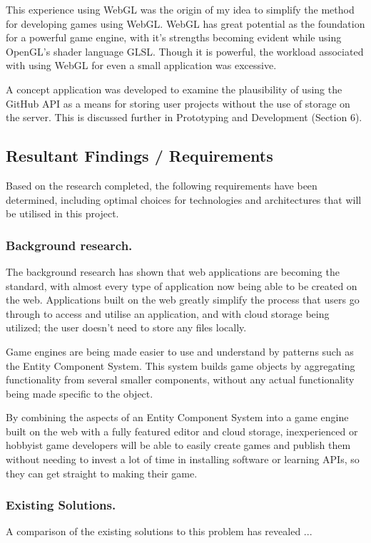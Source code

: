 \documentclass[a4paper, 12pt]{article}
\begin{document}
This experience using WebGL was the origin of my idea to simplify the method for developing games using WebGL. WebGL has great potential as the foundation for a powerful game engine, with it's strengths becoming evident while using OpenGL's shader language GLSL. Though it is powerful, the workload associated with using WebGL for even a small application was excessive.

A concept application was developed to examine the plausibility of using the GitHub API as a means for storing user projects without the use of storage on the server. This is discussed further in Prototyping and Development (Section 6).

\subsection{Resultant Findings / Requirements}
Based on the research completed, the following requirements have been determined, including optimal choices for technologies and architectures that will be utilised in this project.

\subsubsection{Background research.}
The background research has shown that web applications are becoming the standard, with almost every type of application now being able to be created on the web. Applications built on the web greatly simplify the process that users go through to access and utilise an application, and with cloud storage being utilized; the user doesn't need to store any files locally.

Game engines are being made easier to use and understand by patterns such as the Entity Component System. This system builds game objects by aggregating functionality from several smaller components, without any actual functionality being made specific to the object.

By combining the aspects of an Entity Component System into a game engine built on the web with a fully featured editor and cloud storage, inexperienced or hobbyist game developers will be able to easily create games and publish them without needing to invest a lot of time in installing software or learning APIs, so they can get straight to making their game.

\subsubsection{Existing Solutions.}
A comparison of the existing solutions to this problem has revealed ...
\end{document}
